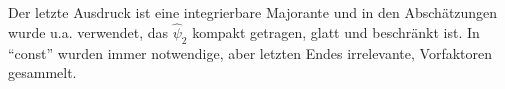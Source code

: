 
Der letzte Ausdruck ist eine integrierbare Majorante und in den Abschätzungen wurde u.a. verwendet, das $\hat\psi_2$ kompakt getragen, glatt und beschränkt ist. In "`const"' wurden immer notwendige, aber letzten Endes irrelevante, Vorfaktoren gesammelt.

